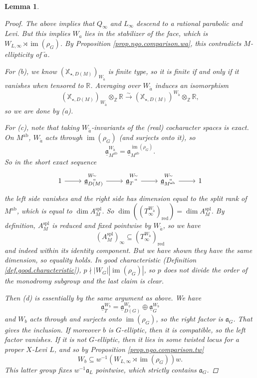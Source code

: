\documentclass[openany]{amsbook}
\newtheorem{lemma}[theorem]{Lemma}
\theoremstyle{definition}
\theoremstyle{remark}
\numberwithin{equation}{section}
\newcommand{\R}{\mathbb{R}}
\newcommand{\Z}{\mathbb{Z}}
\newcommand{\red}{\mathrm{red}}
\newcommand{\im}{\operatorname{im}}
\newcommand{\ul}[1]{\underline{#1}}
\renewcommand{\-}{\operatorname{-}}
\renewcommand{\a}{\mathfrak{a}}
\newcommand{\wtilde}[1]{\widetilde{#1}}
\newcommand{\bX}{\mathbb{X}}
\newcommand{\spl}{\mathrm{spl}}
\newcommand{\ab}{\mathrm{ab}}
\newcommand{\ga}{\ul{\a}}
\begin{document}
\begin{lemma}
\begin{proof}
    The above implies that $Q_\infty$ and $L_\infty$ descend to a rational parabolic and Levi. But this implies $W_a$ lies in the stabilizer of the face, which is $W_{L, \infty} \rtimes \im(\rho_G)$. By Proposition \ref{prop.ngo.comparison.wa}, this contradicts $M$-ellipticity of $\wtilde{a}$.

        For (b), we know $(\bX_{\star, D(M)})_{W_{\wtilde{a}}}$ is finite type, so it is finite if and only if it vanishes when tensored to $\R$. Averaging over $W_{\wtilde{a}}$ induces an isomorphism
        $$
            (\bX_{\star, D(M)})_{W_{\wtilde{a}}} \otimes_{\Z} \R \xrightarrow{\sim} (\bX_{\star, D(M)})^{W_{\wtilde{a}}} \otimes_{\Z} \R,
        $$
        so we are done by (a).

        For (c), note that taking $W_{\wtilde{a}}$-invariants of the (real) cocharacter spaces is exact. On $M^{\ab}$, $W_{\wtilde{a}}$ acts through $\im(\rho_G)$ (and surjects onto it), so
        $$
            \ga_{M^{\ab}}^{W_{\wtilde{a}}} = \ga_{M^{\ab}}^{\im(\rho_G)}.
        $$
        So in the short exact sequence
        $$
        \begin{tikzcd}[ampersand replacement=\&]
        1 \ar[r] \& \ga_{D(M)}^{W_{\wtilde{a}}} \ar[r] \& \ga_T^{W_{\wtilde{a}}} \ar[r] \& \ga_{M^{\ab}}^{W_{\wtilde{a}}} \ar[r] \& 1
        \end{tikzcd}
        $$
        the left side vanishes and the right side has dimension equal to the split rank of $M^{\ab}$, which is equal to $\dim A_M^{\spl}$. So $\dim({(T_\infty^{W_{\wtilde{a}}})}_{\red}) = \dim A_M^{\spl}$. By definition, $A_M^{\spl}$ is reduced and fixed pointwise by ${W_{\wtilde{a}}}$, so we have
        $$
            (A_M^{\spl})_\infty \subseteq {(T_{\infty}^{W_{\wtilde{a}}})}_{\red}
        $$
        and indeed within its identity component. But we have shown they have the same dimension, so equality holds. In good characteristic (Definition \ref{def.good.characteristic}), $p \nmid |W_G| |\im(\rho_G)|$, so $p$ does not divide the order of the monodromy subgroup and the last claim is clear.

        Then (d) is essentially by the same argument as above. We have
        $$
            \ga_T^{W_b} = \ga_{D(G)}^{W_b} \oplus \ga_{G}^{W_b}
        $$
        and $W_b$ acts through and surjects onto $\im(\rho_G)$, so the right factor is $\a_G$. That gives the inclusion. If moreover $b$ is $G$-elliptic, then it is compatible, so the left factor vanishes. If it is not $G$-elliptic, then it lies in some twisted locus for a proper $X$-Levi $L$, and so by Proposition \ref{prop.ngo.comparison.tw}
        $$
            W_b \subseteq w^{-1}(W_{L, \infty} \rtimes \im(\rho_G)) w.
        $$
        This latter group fixes $w^{-1} \a_L$ pointwise, which strictly contains $\a_G$.
\end{proof}
\end{lemma}
\end{document}
